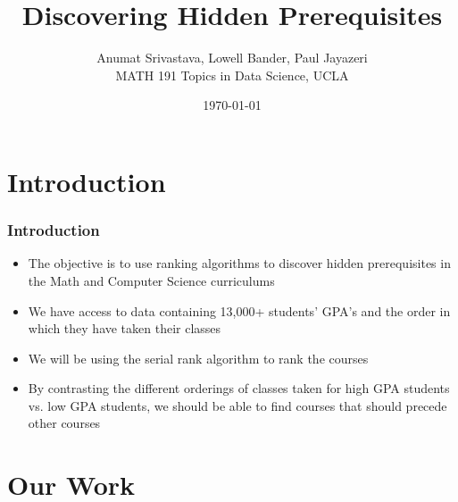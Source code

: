 \documentclass{beamer}
\title{Discovering Hidden Prerequisites}
\author{ Anumat Srivastava, Lowell Bander, Paul Jayazeri\\
\vspace{5mm}
MATH 191 Topics in Data Science, UCLA}
\date{ \today}
\begin{document}
\newtheorem{theo}{Theorem}
\newtheorem{lem}{Lemma}
\newtheorem{defin}{Definition}
\newtheorem{prop}{Proposition}
\newtheorem{ex}{Example}
\newtheorem{alg}{Algorithm}
\newtheorem{cor}{Corollary}
\newtheorem{case}{Case}


\begin{frame}
  \titlepage
\end{frame}



\section{Introduction}

\begin{frame}
     \frametitle{Introduction}
\begin{itemize}
\item The objective is to use ranking algorithms to discover hidden prerequisites in the Math and Computer Science curriculums 
\item  We have access to data containing 13,000+ students' GPA's and the order in which they have taken their classes
\item  We will be using the serial rank algorithm to rank the courses
\item By contrasting the different orderings of classes taken for high GPA students vs. low GPA students, we should be able to find courses that should precede other courses
\end{itemize}
\end{frame}



\section{Our Work}
\end{document}
